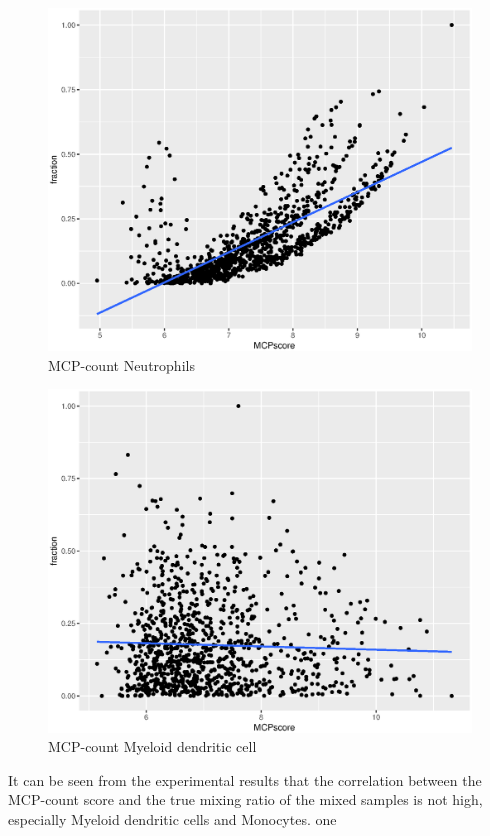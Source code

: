 \documentclass{article}
\begin{document}
\begin{figure}[H]
     \centering
     \includegraphics[width=5in]{MCP-NEUT.eps}
     \caption{MCP-count Neutrophils}
     \label{fig:my_label}
\end{figure}
\begin{figure}[H]
     \centering
     \includegraphics[width=5in]{MCP-MDC.eps}
     \caption{MCP-count Myeloid dendritic cell}
     \label{fig:my_label}
\end{figure}
It can be seen from the experimental results that the correlation between the MCP-count score and the true mixing ratio of the mixed samples is not high, especially Myeloid dendritic cells and Monocytes.
one
\end{document}
